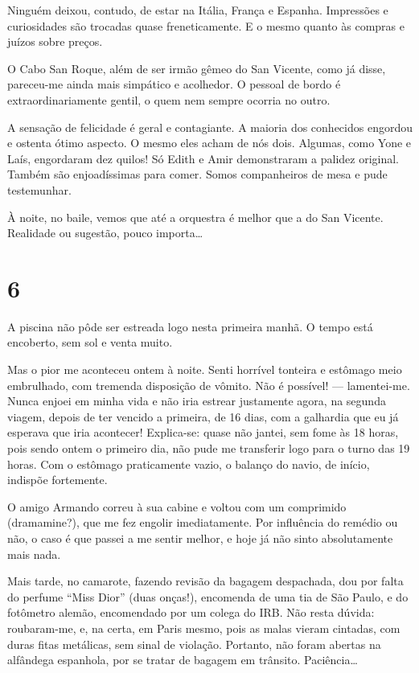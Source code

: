 Ninguém deixou, contudo, de estar na Itália, França e Espanha. Impressões e curiosidades são trocadas quase freneticamente. E o mesmo quanto às compras e juízos sobre preços.

O Cabo San Roque, além de ser irmão gêmeo do San Vicente, como já disse, pareceu-me ainda mais simpático e acolhedor. O pessoal de bordo é extraordinariamente gentil, o quem nem sempre ocorria no outro.

A sensação de felicidade é geral e contagiante. A maioria dos conhecidos engordou e ostenta ótimo aspecto. O mesmo eles acham de nós dois. Algumas, como Yone e Laís, engordaram dez quilos! Só Edith e Amir demonstraram a palidez original. Também são enjoadíssimas para comer. Somos companheiros de mesa e pude testemunhar.

À noite, no baile, vemos que até a orquestra é melhor que a do San Vicente. Realidade ou sugestão, pouco importa\ldots

\section*{6 \adfflatleafright {}}
A piscina não pôde ser estreada logo nesta primeira manhã. O tempo está encoberto, sem sol e venta muito.

Mas o pior me aconteceu ontem à noite. Senti horrível tonteira e estômago meio embrulhado, com tremenda disposição de vômito. Não é possível! --- lamentei-me. Nunca enjoei em minha vida e não iria estrear justamente agora, na segunda viagem, depois de ter vencido a primeira, de 16 dias, com a galhardia que eu já esperava que iria acontecer! Explica-se: quase não jantei, sem fome às 18 horas, pois sendo ontem o primeiro dia, não pude me transferir logo para o turno das 19 horas. Com o estômago praticamente vazio, o balanço do navio, de início, indispõe fortemente.

O amigo Armando correu à sua cabine e voltou com um comprimido (dramamine?), que me fez engolir imediatamente. Por influência do remédio ou não, o caso é que passei a me sentir melhor, e hoje já não sinto absolutamente mais nada.

Mais tarde, no camarote, fazendo revisão da bagagem despachada, dou por falta do perfume ``Miss Dior'' (duas onças!), encomenda de uma tia de São Paulo, e do fotômetro alemão, encomendado por um colega do IRB. Não resta dúvida: roubaram-me, e, na certa, em Paris mesmo, pois as malas vieram cintadas, com duras fitas metálicas, sem sinal de violação. Portanto, não foram abertas na alfândega espanhola, por se tratar de bagagem em trânsito. Paciência\ldots

